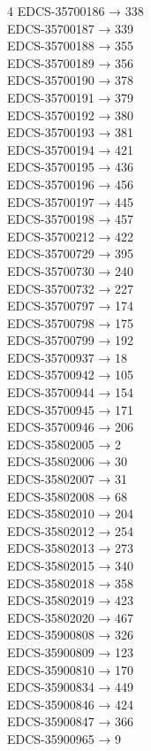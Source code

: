 \begin{multicols}{4}
EDCS-35700186 → 338\\
EDCS-35700187 → 339\\
EDCS-35700188 → 355\\
EDCS-35700189 → 356\\
EDCS-35700190 → 378\\
EDCS-35700191 → 379\\
EDCS-35700192 → 380\\
EDCS-35700193 → 381\\
EDCS-35700194 → 421\\
EDCS-35700195 → 436\\
EDCS-35700196 → 456\\
EDCS-35700197 → 445\\
EDCS-35700198 → 457\\
EDCS-35700212 → 422\\
EDCS-35700729 → 395\\
EDCS-35700730 → 240\\
EDCS-35700732 → 227\\
EDCS-35700797 → 174\\
EDCS-35700798 → 175\\
EDCS-35700799 → 192\\
EDCS-35700937 → 18\\
EDCS-35700942 → 105\\
EDCS-35700944 → 154\\
EDCS-35700945 → 171\\
EDCS-35700946 → 206\\
EDCS-35802005 → 2\\
EDCS-35802006 → 30\\
EDCS-35802007 → 31\\
EDCS-35802008 → 68\\
EDCS-35802010 → 204\\
EDCS-35802012 → 254\\
EDCS-35802013 → 273\\
EDCS-35802015 → 340\\
EDCS-35802018 → 358\\
EDCS-35802019 → 423\\
EDCS-35802020 → 467\\
EDCS-35900808 → 326\\
EDCS-35900809 → 123\\
EDCS-35900810 → 170\\
EDCS-35900834 → 449\\
EDCS-35900846 → 424\\
EDCS-35900847 → 366\\
EDCS-35900965 → 9\\

\end{multicols}
